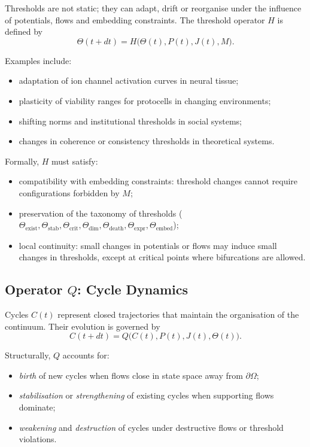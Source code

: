 Thresholds are not static; they can adapt, drift or reorganise under the
influence of potentials, flows and embedding constraints. The threshold
operator \(H\) is defined by
\[
  \Theta(t+dt) = H\big(\Theta(t), P(t), J(t), M\big).
\]

Examples include:
\begin{itemize}
  \item adaptation of ion channel activation curves in neural tissue;
  \item plasticity of viability ranges for protocells in changing environments;
  \item shifting norms and institutional thresholds in social systems;
  \item changes in coherence or consistency thresholds in theoretical systems.
\end{itemize}

Formally, \(H\) must satisfy:
\begin{itemize}
  \item compatibility with embedding constraints: threshold changes cannot
        require configurations forbidden by \(M\);
  \item preservation of the taxonomy of thresholds
        (\(\Theta_{\mathrm{exist}}, \Theta_{\mathrm{stab}},
        \Theta_{\mathrm{crit}}, \Theta_{\mathrm{dim}},
        \Theta_{\mathrm{death}}, \Theta_{\mathrm{expr}}, \Theta_{\mathrm{embed}}\));
  \item local continuity: small changes in potentials or flows may induce small
        changes in thresholds, except at critical points where bifurcations are
        allowed.
\end{itemize}

\subsection{Operator \texorpdfstring{\texorpdfstring{$Q$}{Q}}{Q}: Cycle Dynamics}

Cycles \(C(t)\) represent closed trajectories that maintain the organisation of
the continuum. Their evolution is governed by
\[
  C(t+dt) = Q\big(C(t), P(t), J(t), \Theta(t)\big).
\]

Structurally, \(Q\) accounts for:
\begin{itemize}
  \item \emph{birth} of new cycles when flows close in state space away from
        \(\partial\Omega\);
  \item \emph{stabilisation} or \emph{strengthening} of existing cycles when
        supporting flows dominate;
  \item \emph{weakening} and \emph{destruction} of cycles under destructive
        flows or threshold violations.
\end{itemize}

